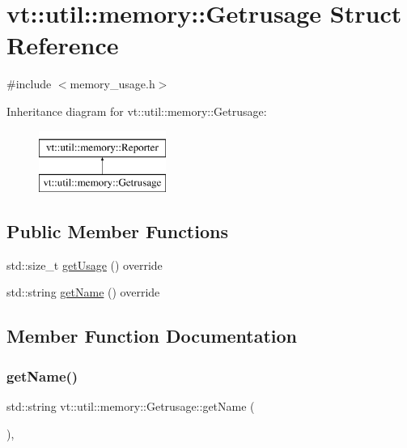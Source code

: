 \hypertarget{structvt_1_1util_1_1memory_1_1_getrusage}{}\section{vt\+:\+:util\+:\+:memory\+:\+:Getrusage Struct Reference}
\label{structvt_1_1util_1_1memory_1_1_getrusage}


{\ttfamily \#include $<$memory\+\_\+usage.\+h$>$}

Inheritance diagram for vt\+:\+:util\+:\+:memory\+:\+:Getrusage\+:\begin{figure}[H]
\begin{center}
\leavevmode
\includegraphics[height=2.000000cm]{structvt_1_1util_1_1memory_1_1_getrusage}
\end{center}
\end{figure}
\subsection*{Public Member Functions}
\begin{DoxyCompactItemize}
\item 
std\+::size\+\_\+t \hyperlink{structvt_1_1util_1_1memory_1_1_getrusage_a976a842feb631dfb19c2f4ecda2398ab}{get\+Usage} () override
\item 
std\+::string \hyperlink{structvt_1_1util_1_1memory_1_1_getrusage_ae1261aca38feffabbbc8b8a510556d8b}{get\+Name} () override
\end{DoxyCompactItemize}


\subsection{Member Function Documentation}
\mbox{\label{structvt_1_1util_1_1memory_1_1_getrusage_ae1261aca38feffabbbc8b8a510556d8b}} 
\subsubsection{\texorpdfstring{get\+Name()}{getName()}}
{\footnotesize\ttfamily std\+::string vt\+::util\+::memory\+::\+Getrusage\+::get\+Name (\begin{DoxyParamCaption}{ }\end{DoxyParamCaption})\hspace{0.3cm}{\ttfamily [override]}, {\ttfamily [virtual]}}



